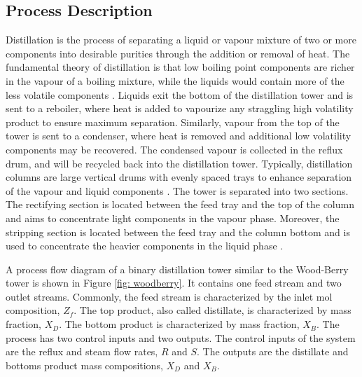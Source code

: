 \subsection{Process Description}
Distillation is the process of separating a liquid or vapour mixture of two or more components into desirable purities through the addition or removal of heat. The fundamental theory of distillation is that low boiling point components are richer in the vapour of a boiling mixture, while the liquids would contain more of the less volatile components \cite{distillation_intro}.  Liquids exit the bottom of the distillation tower and is sent to a reboiler, where heat is added to vapourize any straggling high volatility product to ensure maximum separation. Similarly, vapour from the top of the tower is sent to a condenser, where heat is removed and additional low volatility components may be recovered. The condensed vapour is collected in the reflux drum, and will be recycled back into the distillation tower. Typically, distillation columns are large vertical drums with evenly spaced trays to enhance separation of the vapour and liquid components \cite{mpc_for_distillation_tower}.  The tower is separated into two sections.  The rectifying section is located between the feed tray and the top of the column and aims to concentrate light components in the vapour phase.  Moreover, the stripping section is located between the feed tray and the column bottom and is used to concentrate the heavier components in the liquid phase \cite{henry_distillation}.

A process flow diagram of a binary distillation tower similar to the Wood-Berry tower is shown in Figure \ref{fig: woodberry}.  It contains one feed stream and two outlet streams.  Commonly, the feed stream is characterized by the inlet mol composition, $Z_f$.  The top product, also called distillate, is characterized by mass fraction, $X_D$.  The bottom product is characterized by mass fraction, $X_B$.  The process has two control inputs and two outputs. The control inputs of the system are the reflux and steam flow rates, $R$ and $S$.  The outputs are the distillate and bottoms product mass compositions, $X_D$ and $X_B$.

